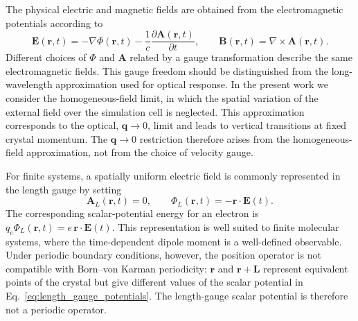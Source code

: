 The physical electric and magnetic fields are obtained from the
electromagnetic potentials according to
\begin{equation}
  \mathbf E(\mathbf r,t)
  =
  -\nabla\Phi(\mathbf r,t)
  -
  \frac{1}{c}
  \frac{\partial\mathbf A(\mathbf r,t)}{\partial t},
  \qquad
  \mathbf B(\mathbf r,t)
  =
  \nabla\times\mathbf A(\mathbf r,t).
  \label{eq:fields_from_potentials}
\end{equation}
Different choices of $\Phi$ and $\mathbf A$ related by a gauge
transformation describe the same electromagnetic fields.  This gauge
freedom should be distinguished from the long-wavelength approximation
used for optical response.  In the present work we consider the
homogeneous-field limit, in which the spatial variation of the external
field over the simulation cell is neglected.  This approximation
corresponds to the optical, $\mathbf q\rightarrow 0$, limit and leads to
vertical transitions at fixed crystal momentum.  The
$\mathbf q\rightarrow 0$ restriction therefore arises from the
homogeneous-field approximation, not from the choice of velocity gauge.

For finite systems, a spatially uniform electric field is commonly
represented in the length gauge by setting
\begin{equation}
  \mathbf A_L(\mathbf r,t)=0,
  \qquad
  \Phi_L(\mathbf r,t)=-\mathbf r\cdot\mathbf E(t).
  \label{eq:length_gauge_potentials}
\end{equation}
The corresponding scalar-potential energy for an electron is
$q_e\Phi_L(\mathbf r,t)=e\,\mathbf r\cdot\mathbf E(t)$.  This
representation is well suited to finite molecular systems, where the
time-dependent dipole moment is a well-defined observable.  Under
periodic boundary conditions, however, the position operator is not
compatible with Born--von Karman periodicity: $\mathbf r$ and
$\mathbf r+\mathbf L$ represent equivalent points of the crystal but
give different values of the scalar potential in
Eq.~\eqref{eq:length_gauge_potentials}.  The length-gauge scalar
potential is therefore not a periodic operator.

